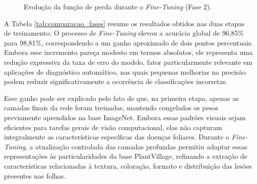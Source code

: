 \documentclass[portuguese]{sbc2025}%
\begin{document}
\begin{figure}[ht]
\centering
{}
\caption{Evolução da função de perda durante o \textit{Fine-Tuning} (Fase 2).}
\label{fig:loss_fase2}
\end{figure}

A Tabela \ref{tab:comparacao_fases} resume os resultados obtidos nas duas etapas de treinamento. O processo de \textit{Fine-Tuning} 
elevou a acurácia global de 96,85\% para 98,81\%, correspondendo a um ganho aproximado de dois pontos percentuais. Embora esse 
incremento pareça modesto em termos absolutos, ele representa uma redução expressiva da taxa de erro do modelo, fator particularmente
relevante em aplicações de diagnóstico automático, nas quais pequenas melhorias na precisão podem reduzir significativamente a ocorrência
de classificações incorretas.

Esse ganho pode ser explicado pelo fato de que, na primeira etapa, apenas as camadas finais da rede foram treinadas, mantendo congelados
os pesos previamente aprendidos na base ImageNet. Embora essas padrões visuais sejam eficientes para tarefas gerais de visão 
computacional, elas não capturam integralmente as características específicas das doenças foliares. Durante o \textit{Fine-Tuning}, 
a atualização controlada das camadas profundas permitiu adaptar essas representações às particularidades da base PlantVillage, 
refinando a extração de características relacionadas à textura, coloração, formato e distribuição das lesões presentes nas folhas.
\end{document}
